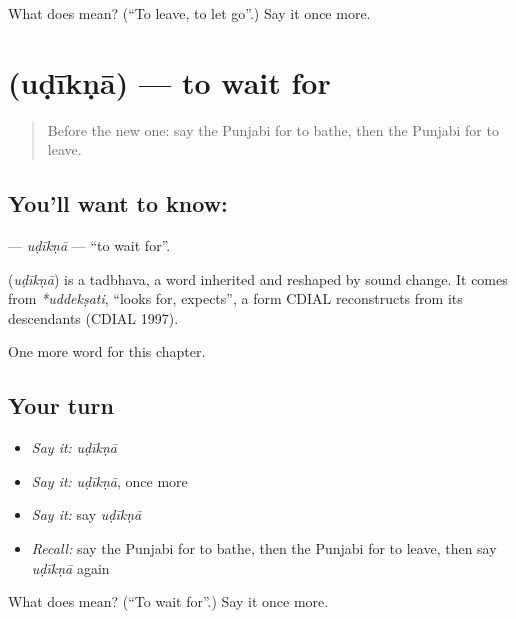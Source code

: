 \begin{tcolorbox}[breakable,colback=teal!4,colframe=teal!35!black,title={Before you move on}]
What does  mean? (\textquotedblleft{}To leave, to let go\textquotedblright{}.) Say it once more.
\end{tcolorbox}
\section[\texorpdfstring{\pa{ਉਡੀਕਣਾ} (uḍīkṇā)}{ਉਡੀਕਣਾ (uḍīkṇā)}]{ (uḍīkṇā) — to wait for}

\label{lesson:PA-C62-udikna}



\begin{quote}
Before the new one: say the Punjabi for to bathe, then the Punjabi for to leave.
\end{quote}

\subsection*{You'll want to know: }
\textbf{} — \emph{uḍīkṇā} — \textquotedblleft{}to wait for\textquotedblright{}.

\begin{cousinweb}
\textbf{} (\emph{uḍīkṇā}) is a tadbhava, a word inherited and reshaped by sound change. It comes from \emph{*uddekṣati}, \textquotedblleft{}looks for, expects\textquotedblright{}, a form CDIAL reconstructs from its descendants (CDIAL 1997).
\end{cousinweb}

\begin{grammarlens}[title={What you've built}]
One more word for this chapter.
\end{grammarlens}

\subsection*{Your turn}
\begin{itemize}
\raggedright
  \item \emph{Say it:} \emph{uḍīkṇā}
  \item \emph{Say it:} \emph{uḍīkṇā}, once more
  \item \emph{Say it:} say \emph{uḍīkṇā}
  \item \emph{Recall:} say the Punjabi for to bathe, then the Punjabi for to leave, then say \emph{uḍīkṇā} again
\end{itemize}

\begin{tcolorbox}[breakable,colback=teal!4,colframe=teal!35!black,title={Before you move on}]
What does  mean? (\textquotedblleft{}To wait for\textquotedblright{}.) Say it once more.
\end{tcolorbox}
